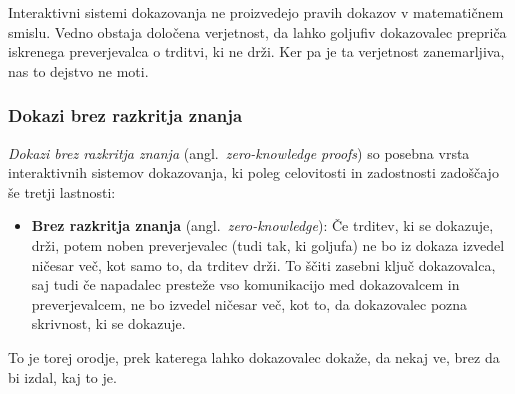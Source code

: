\begin{opomba}
    Interaktivni sistemi dokazovanja ne proizvedejo pravih dokazov v matematičnem smislu. Vedno
    obstaja določena verjetnost, da lahko goljufiv dokazovalec prepriča iskrenega preverjevalca o
    trditvi, ki ne drži. Ker pa je ta verjetnost zanemarljiva, nas to dejstvo ne moti.
\end{opomba}

\subsubsection{Dokazi brez razkritja znanja}
\textit{Dokazi brez razkritja znanja} (angl.\ \textit{zero-knowledge proofs}) so posebna vrsta interaktivnih
sistemov dokazovanja, ki poleg celovitosti in zadostnosti zadoščajo še tretji lastnosti:
\begin{itemize}
    \item \textbf{Brez razkritja znanja} (angl.\ \textit{zero-knowledge}): Če trditev, ki se dokazuje, 
        drži, potem noben preverjevalec (tudi tak, ki goljufa) ne bo iz dokaza izvedel ničesar več, 
        kot samo to, da trditev drži. To ščiti zasebni ključ dokazovalca, saj tudi če napadalec
        presteže vso komunikacijo med dokazovalcem in preverjevalcem, ne bo izvedel ničesar
        več, kot to, da dokazovalec pozna skrivnost, ki se dokazuje.
\end{itemize}
To je torej orodje, prek katerega lahko dokazovalec dokaže, da nekaj ve, brez da bi izdal, kaj to je.

